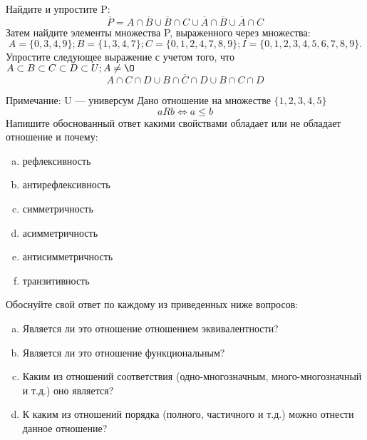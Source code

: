 \documentclass[10pt]{exam}
\begin{document}
\begin{questions}
\question
Найдите и упростите P:
\begin{equation*}
\overline{P} = A \cap \overline{B} \cup \overline{B} \cap C \cup \overline{A} \cap \overline{B} \cup \overline{A} \cap C
\end{equation*}
Затем найдите элементы множества P, выраженного через множества:
\begin{equation*}
A = \{0, 3, 4, 9\}; 
B = \{1, 3, 4, 7\};
C = \{0, 1, 2, 4, 7, 8, 9\};
I = \{0, 1, 2, 3, 4, 5, 6, 7, 8, 9\}.
\end{equation*}\question
Упростите следующее выражение с учетом того, что $A\subset B \subset C \subset D \subset U; A \neq \O$
\begin{equation*}
A \cap C  \cap D \cup B \cap \overline{C} \cap D \cup B \cap C \cap D
\end{equation*}

Примечание: U — универсум\question
Дано отношение на множестве $\{1, 2, 3, 4, 5\}$ 
\begin{equation*}
aRb \iff a \leq b
\end{equation*}
Напишите обоснованный ответ какими свойствами обладает или не обладает отношение и почему:   
\begin{enumerate} [a)]\setcounter{enumi}{0}
\item рефлексивность
\item антирефлексивность
\item симметричность
\item асимметричность
\item антисимметричность
\item транзитивность
\end{enumerate}

Обоснуйте свой ответ по каждому из приведенных ниже вопросов:
\begin{enumerate} [a)]\setcounter{enumi}{0}
    \item Является ли это отношение отношением эквивалентности?
    \item Является ли это отношение функциональным?
    \item Каким из отношений соответствия (одно-многозначным, много-многозначный и т.д.) оно является?
    \item К каким из отношений порядка (полного, частичного и т.д.) можно отнести данное отношение?
\end{enumerate}



\end{questions}
\end{document}
